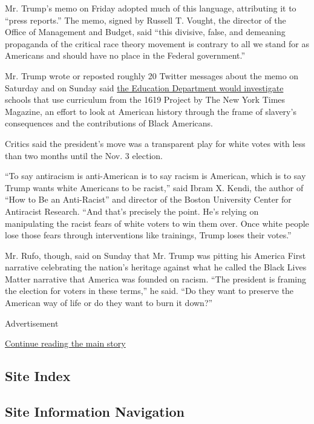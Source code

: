 Mr. Trump's memo on Friday adopted much of this language, attributing it
to ``press reports.'' The memo, signed by Russell T. Vought, the
director of the Office of Management and Budget, said ``this divisive,
false, and demeaning propaganda of the critical race theory movement is
contrary to all we stand for as Americans and should have no place in
the Federal government.''

Mr. Trump wrote or reposted roughly 20 Twitter messages about the memo
on Saturday and on Sunday said
\href{https://twitter.com/realDonaldTrump/status/1302586046551597061}{the
Education Department would investigate} schools that use curriculum from
the 1619 Project by The New York Times Magazine, an effort to look at
American history through the frame of slavery's consequences and the
contributions of Black Americans.

Critics said the president's move was a transparent play for white votes
with less than two months until the Nov. 3 election.

``To say antiracism is anti-American is to say racism is American, which
is to say Trump wants white Americans to be racist,'' said Ibram X.
Kendi, the author of ``How to Be an Anti-Racist'' and director of the
Boston University Center for Antiracist Research. ``And that's precisely
the point. He's relying on manipulating the racist fears of white voters
to win them over. Once white people lose those fears through
interventions like trainings, Trump loses their votes.''

Mr. Rufo, though, said on Sunday that Mr. Trump was pitting his America
First narrative celebrating the nation's heritage against what he called
the Black Lives Matter narrative that America was founded on racism.
``The president is framing the election for voters in these terms,'' he
said. ``Do they want to preserve the American way of life or do they
want to burn it down?''

Advertisement

\protect\hyperlink{after-bottom}{Continue reading the main story}

\hypertarget{site-index}{%
\subsection{Site Index}\label{site-index}}

\hypertarget{site-information-navigation}{%
\subsection{Site Information
Navigation}\label{site-information-navigation}}

